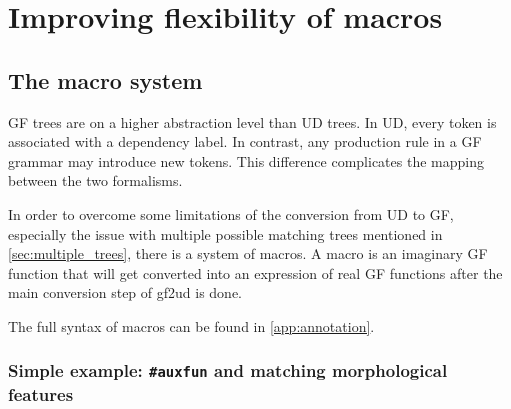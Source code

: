 \chapter{Improving flexibility of macros}\label{sect:flex}
\label{improving-flexibility-macros}


\section{The macro system}


GF trees are on a higher abstraction level than UD trees. In UD, every token is associated with a dependency label. In contrast, any production rule in a GF grammar may introduce new tokens. This difference complicates the mapping between the two formalisms.

In order to overcome some limitations of the conversion from UD to GF, especially the issue with multiple possible matching trees mentioned in \autoref{sec:multiple_trees}, there is a system of macros. A macro is an imaginary GF function that will get converted into an expression of real GF functions after the main conversion step of gf2ud is done.

The full syntax of macros can be found in \autoref{app:annotation}.

\subsection{Simple example: \texttt{\#auxfun} and matching morphological features}

